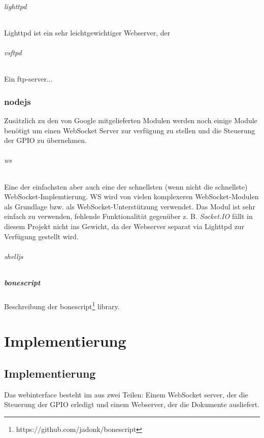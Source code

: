 \documentclass[12pt, twoside, a4paper]{scrbook}
\begin{document}
\paragraph{lighttpd} Lighttpd ist ein sehr leichtgewichtiger Webserver, der 

\paragraph{vsftpd} Ein ftp-server...

\section{nodejs}
Zusätzlich zu den von Google mitgelieferten Modulen werden noch einige Module benötigt um einen WebSocket Server zur verfügung zu stellen und die Steuerung der GPIO zu übernehmen.

\paragraph{ws} Eine der einfachsten aber auch eine der schnellsten (wenn nicht die schnellste) WebSocket-Implemtierung. WS wird von vielen komplexeren WebSocket-Modulen als Grundlage bzw. als WebSocket-Unterstützung verwendet. Das Modul ist sehr einfach zu verwenden, fehlende Funktionalität gegenüber z. B. \emph{Socket.IO} fällt in diesem Projekt nicht ins Gewicht, da der Webserver separat via Lighttpd zur Verfügung gestellt wird.

\paragraph{shelljs}

\subsubsection{bonescript}
Beschreibung der bonescript\footnote{https://github.com/jadonk/bonescript} library.


\part{Implementierung}

\chapter{Implementierung}
Das webinterface besteht im aus zwei Teilen: Einem WebSocket server, der die Steuerung der GPIO erledigt und einem Webserver, der die Dokumente ausliefert.
\end{document}
